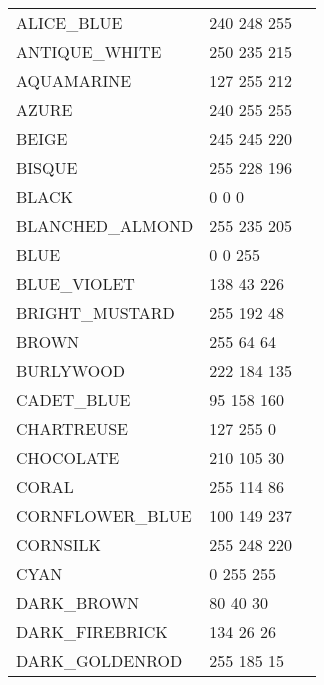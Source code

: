 \documentclass{article}
\begin{document}
\begin{longtable}{lll}
ALICE\_BLUE & 240 248 255 & \colorbox[RGB]{240 248 255}{\phantom{MMMMMMMM}}\\
ANTIQUE\_WHITE & 250 235 215 & \colorbox[RGB]{250 235 215}{\phantom{MMMMMMMM}}\\
AQUAMARINE & 127 255 212 & \colorbox[RGB]{127 255 212}{\phantom{MMMMMMMM}}\\
AZURE & 240 255 255 & \colorbox[RGB]{240 255 255}{\phantom{MMMMMMMM}}\\
BEIGE & 245 245 220 & \colorbox[RGB]{245 245 220}{\phantom{MMMMMMMM}}\\
BISQUE & 255 228 196 & \colorbox[RGB]{255 228 196}{\phantom{MMMMMMMM}}\\
BLACK & 0 0 0 & \colorbox[RGB]{0 0 0}{\phantom{MMMMMMMM}}\\
BLANCHED\_ALMOND & 255 235 205 & \colorbox[RGB]{255 235 205}{\phantom{MMMMMMMM}}\\
BLUE & 0 0 255 & \colorbox[RGB]{0 0 255}{\phantom{MMMMMMMM}}\\
BLUE\_VIOLET & 138 43 226 & \colorbox[RGB]{138 43 226}{\phantom{MMMMMMMM}}\\
BRIGHT\_MUSTARD & 255 192 48 & \colorbox[RGB]{255 192 48}{\phantom{MMMMMMMM}}\\
BROWN & 255 64 64 & \colorbox[RGB]{255 64 64}{\phantom{MMMMMMMM}}\\
BURLYWOOD & 222 184 135 & \colorbox[RGB]{222 184 135}{\phantom{MMMMMMMM}}\\
CADET\_BLUE & 95 158 160 & \colorbox[RGB]{95 158 160}{\phantom{MMMMMMMM}}\\
CHARTREUSE & 127 255 0 & \colorbox[RGB]{127 255 0}{\phantom{MMMMMMMM}}\\
CHOCOLATE & 210 105 30 & \colorbox[RGB]{210 105 30}{\phantom{MMMMMMMM}}\\
CORAL & 255 114 86 & \colorbox[RGB]{255 114 86}{\phantom{MMMMMMMM}}\\
CORNFLOWER\_BLUE & 100 149 237 & \colorbox[RGB]{100 149 237}{\phantom{MMMMMMMM}}\\
CORNSILK & 255 248 220 & \colorbox[RGB]{255 248 220}{\phantom{MMMMMMMM}}\\
CYAN & 0 255 255 & \colorbox[RGB]{0 255 255}{\phantom{MMMMMMMM}}\\
DARK\_BROWN & 80 40 30 & \colorbox[RGB]{80 40 30}{\phantom{MMMMMMMM}}\\
DARK\_FIREBRICK & 134 26 26 & \colorbox[RGB]{134 26 26}{\phantom{MMMMMMMM}}\\
DARK\_GOLDENROD & 255 185 15 & \colorbox[RGB]{255 185 15}{\phantom{MMMMMMMM}}\\

\end{longtable}
\end{document}

